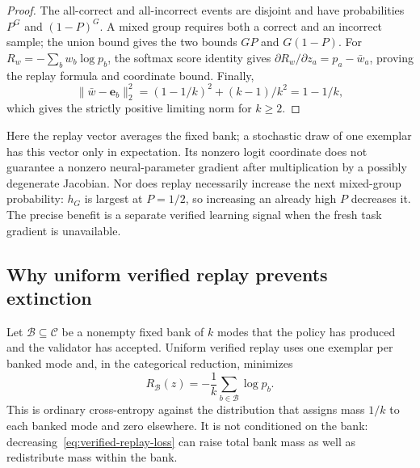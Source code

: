 \begin{proof}
The all-correct and all-incorrect events are disjoint and have probabilities
$P^G$ and $(1-P)^G$. A mixed group requires both a correct and an incorrect
sample; the union bound gives the two bounds $GP$ and $G(1-P)$.
For $R_w=-\sum_b w_b\log p_b$, the softmax score identity gives
$\partial R_w/\partial z_a=p_a-\bar w_a$, proving the replay formula and
coordinate bound. Finally,
\[
 \|\bar w-\mathbf e_b\|_2^2=(1-1/k)^2+(k-1)/k^2=1-1/k,
\]
which gives the strictly positive limiting norm for $k\ge2$.
\end{proof}

Here the replay vector averages the fixed bank; a stochastic draw of one
exemplar has this vector only in expectation. Its nonzero logit coordinate
does not guarantee a nonzero neural-parameter gradient after multiplication
by a possibly degenerate Jacobian. Nor does replay necessarily increase the
next mixed-group probability: $h_G$ is largest at $P=1/2$, so increasing an
already high $P$ decreases it. The precise benefit is a separate verified
learning signal when the fresh task gradient is unavailable.

\subsection{Why uniform verified replay prevents extinction}
\label{app:theory-replay}

Let $\mathcal B\subseteq\mathcal C$ be a nonempty fixed bank of $k$ modes that
the policy has produced and the validator has accepted. Uniform verified replay
uses one exemplar per banked mode and, in the categorical reduction, minimizes
\begin{equation}
  R_{\mathcal B}(z)
  =-\frac1k\sum_{b\in\mathcal B}\log p_b.
  \label{eq:verified-replay-loss}
\end{equation}
This is ordinary cross-entropy against the distribution that assigns mass
$1/k$ to each banked mode and zero elsewhere. It is not conditioned on the
bank: decreasing~\eqref{eq:verified-replay-loss} can raise total bank mass as
well as redistribute mass within the bank.

